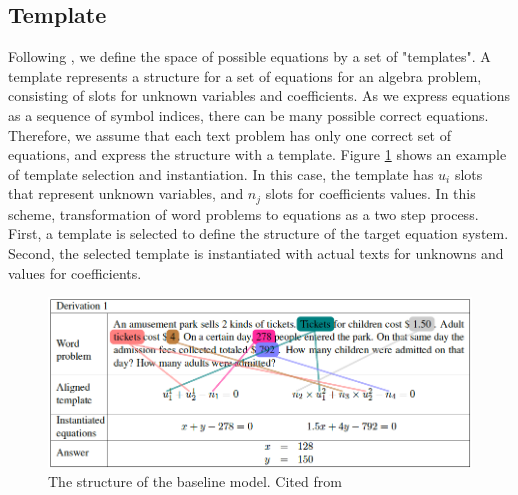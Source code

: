 \documentclass[11pt,letterpaper]{article}
\begin{document}
\subsection{Template}
Following \cite{Kushman2014LearningTA}, we define the space of possible equations by a set of "templates". A template represents a structure for a set of equations for an algebra problem, consisting of slots for unknown variables and coefficients. As we express equations as a sequence of symbol indices, there can be many possible correct equations. Therefore, we assume that each text problem has only one correct set of equations, and express the structure with a template. Figure \ref{template} shows an example of template selection and instantiation. In this case, the template has $u_i$ slots that represent unknown variables, and $n_j$ slots for coefficients values. In this scheme, transformation of word problems to equations as a two step process. First, a template is selected to define the structure of the target equation system. Second, the selected template is instantiated with actual texts for unknowns and values for coefficients.
\begin{figure}[ht]
	\centering
	\includegraphics[bb=0 0 877 353, scale=0.5]{template.png}%
    \caption{The structure of the baseline model. Cited from \cite{Kushman2014LearningTA}}
    \label{template}
\end{figure}
\end{document}
